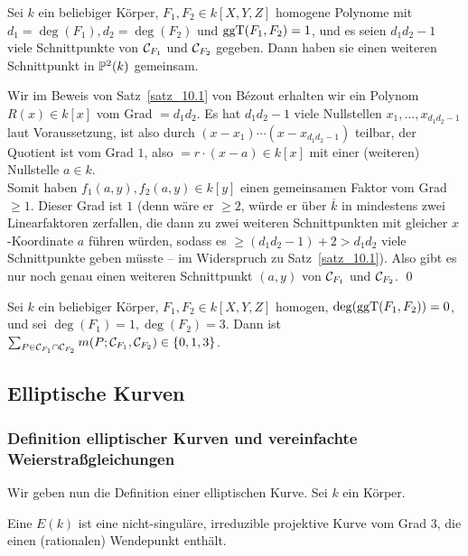 \begin{satz}
\label{satz_10.15}
	Sei $k$ ein beliebiger Körper, $F_1,F_2 \in k[X,Y,Z]$ homogene Polynome mit $d_1 = \deg(F_1), d_2 = \deg(F_2)$ und $\operatorname{ggT}(F_1,F_2) = 1$, und es seien $d_1d_2 - 1$ viele Schnittpunkte von $\mathcal{C}_{F_1}$ und $\mathcal{C}_{F_2}$ gegeben. Dann haben sie einen weiteren Schnittpunkt in $\mathbb{P}^2(k)$ gemeinsam.
\end{satz}

	Wir im Beweis von Satz~\ref{satz_10.1} von Bézout erhalten wir ein Polynom $R(x) \in k[x]$ vom Grad $=d_1d_2$. Es hat $d_1d_2-1$ viele Nullstellen $x_1, \dots, x_{d_1 d_2-1}$ laut Voraussetzung, ist also durch $(x-x_1) \cdots (x-x_{d_1d_2-1})$ teilbar, der Quotient ist vom Grad $1$, also $=r \cdot (x-a) \in k[x]$ mit einer (weiteren) Nullstelle $a \in k$.\\
	Somit haben $f_1(a,y), f_2(a,y) \in k[y]$ einen gemeinsamen Faktor vom Grad $\geq 1$. Dieser Grad ist $1$ (denn wäre er $\geq 2$, würde er über $\overline{k}$ in mindestens zwei Linearfaktoren zerfallen, die dann zu zwei weiteren Schnittpunkten mit gleicher $x$-Koordinate $a$ führen würden, sodass es $\geq (d_1d_2-1)+2 > d_1d_2$ viele Schnittpunkte geben müsste -- im Widerspruch zu Satz~\ref{satz_10.1}). Also gibt es nur noch genau einen weiteren Schnittpunkt $(a,y)$ von $\mathcal{C}_{F_1}$ und $\mathcal{C}_{F_2}$. \qed
	
\begin{bsp}
\label{bsp_10.16}
	Sei $k$ ein beliebiger Körper, $F_1,F_2 \in k[X,Y,Z]$ homogen, $\deg(\operatorname{ggT}(F_1,F_2)) = 0$, und sei $\deg(F_1) = 1, \deg(F_2) = 3$. Dann ist $\sum_{P \in \mathcal{C}_{F_1} \cap \mathcal{C}_{F_2}} m(P;\mathcal{C}_{F_1},\mathcal{C}_{F_2}) \in \{0,1,3\}$.
\end{bsp}
	
\nextlecture
\newpage
\subsection{Elliptische Kurven}
\subsubsection{Definition elliptischer Kurven und vereinfachte Weierstraßgleichungen}
	Wir geben nun die Definition einer elliptischen Kurve. Sei $k$ ein Körper. \marginnote{[11]}
	
\begin{defn}
	Eine  $E(k)$ ist eine nicht-singuläre, irreduzible projektive Kurve vom Grad $3$, die einen (rationalen) Wendepunkt enthält.
\end{defn}
	
